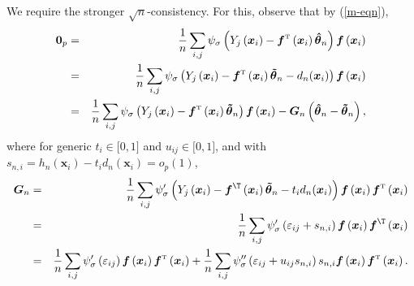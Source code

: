 \documentclass[times, authoryear, 12pt, twoside]{elsarticle}
\begin{document}
We require the stronger $\sqrt{n}$-consistency. For this, observe that by (\ref{m-eqn}), 
\begin{eqnarray}
\boldsymbol{0}_{p} &=&\frac{1}{n}\sum_{i,j}\psi _{\sigma }\left( Y_{j}\left( 
\boldsymbol{x}_{i}\right) -\boldsymbol{f}^{{\mathrm{\scriptscriptstyle T}}%
}\left( \boldsymbol{x}_{i}\right) \boldsymbol{\hat{\theta}}_{n}\right) 
\boldsymbol{f}\left( \boldsymbol{x}_{i}\right)   \notag \\
&=&\frac{1}{n}\sum_{i,j}\psi _{\sigma }\left( Y_{j}\left( \boldsymbol{x}%
_{i}\right) -\boldsymbol{f}^{{\mathrm{\scriptscriptstyle T}}}\left( 
\boldsymbol{x}_{i}\right) \boldsymbol{\tilde{\theta}}_{n}-d_{n}(\boldsymbol{x%
}_{i})\right) \boldsymbol{f}\left( \boldsymbol{x}_{i}\right)   \notag \\
&=&\frac{1}{n}\sum_{i,j}\psi _{\sigma }\left( Y_{j}\left( \boldsymbol{x}%
_{i}\right) -\boldsymbol{f}^{{\mathrm{\scriptscriptstyle T}}}\left( 
\boldsymbol{x}_{i}\right) \boldsymbol{\tilde{\theta}}_{n}\right) \boldsymbol{%
f}\left( \boldsymbol{x}_{i}\right) -\boldsymbol{G}_{n}\left( \boldsymbol{%
\hat{\theta}}_{n}-\boldsymbol{\tilde{\theta}}_{n}\right) ,  \label{exp1}
\end{eqnarray}%
where for generic $t_{i}\in \lbrack 0,1]$ and $u_{ij}\in \lbrack 0,1]$, and
with $s_{n,i}=h_{n}(\boldsymbol{x}_{i})-t_{i}d_{n}(\boldsymbol{x}%
_{i})=o_{p}\left( 1\right) $, 
\begin{eqnarray*}
\boldsymbol{G}_{n} &=&\frac{1}{n}\sum_{i,j}\psi _{\sigma }^{\prime }\left(
Y_{j}\left( \boldsymbol{x}_{i}\right) -\boldsymbol{f}^{\T}\left( \boldsymbol{x%
}_{i}\right) \boldsymbol{\tilde{\theta}}_{n}-t_{i}d_{n}(\boldsymbol{x}%
_{i})\right) \boldsymbol{f}\left( \boldsymbol{x}_{i}\right) \boldsymbol{f}^{{%
\mathrm{\scriptscriptstyle T}}}\left( \boldsymbol{x}_{i}\right)  \\
&=&\frac{1}{n}\sum_{i,j}\psi _{\sigma }^{\prime }\left( \varepsilon
_{ij}+s_{n,i}\right) \boldsymbol{f}\left( \boldsymbol{x}_{i}\right) 
\boldsymbol{f}^{\T}\left( \boldsymbol{x}%
_{i}\right)  \\
&=&\frac{1}{n}\sum_{i,j}\psi _{\sigma }^{\prime }\left( \varepsilon
_{ij}\right) \boldsymbol{f}\left( \boldsymbol{x}_{i}\right) \boldsymbol{f}^{{%
\mathrm{\scriptscriptstyle T}}}\left( \boldsymbol{x}_{i}\right) +\frac{1}{n}%
\sum_{i,j}\psi _{\sigma }^{\prime \prime }\left( \varepsilon
_{ij}+u_{ij}s_{n,i}\right) s_{n,i}\boldsymbol{f}\left( \boldsymbol{x}%
_{i}\right) \boldsymbol{f}^{{\mathrm{\scriptscriptstyle T}}}\left( 
\boldsymbol{x}_{i}\right) .
\end{eqnarray*}%
\end{document}
